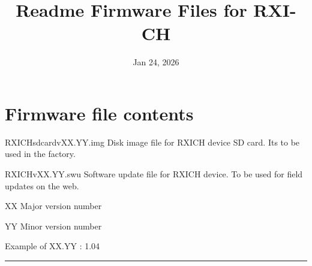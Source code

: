 \documentclass[letterpaper,10pt,english]{sphinxhowto}
\title{Readme Firmware Files for RXI-CH}
\date{Jan 24, 2026}
\author{}
\begin{document}
\pagestyle{empty}

\pagestyle{plain}

\pagestyle{normal}
\label{\detokenize{index::doc}}


\sphinxstepscope


\section{Firmware file contents}
\label{\detokenize{topics/readme_fwf:firmware-file-contents}}\label{\detokenize{topics/readme_fwf::doc}}
\sphinxAtStartPar
RXI\sphinxhyphen{}CH\sphinxhyphen{}sdcard\sphinxhyphen{}vXX.YY.img \sphinxhyphen{} Disk image file for RXI\sphinxhyphen{}CH device SD card. Its to be used in the factory.

\sphinxAtStartPar
RXI\sphinxhyphen{}CH\sphinxhyphen{}vXX.YY.swu \sphinxhyphen{} Software update file for RXI\sphinxhyphen{}CH device. To be used for field updates on the web.

\sphinxAtStartPar
XX \sphinxhyphen{} Major version number

\sphinxAtStartPar
YY \sphinxhyphen{} Minor version number

\sphinxAtStartPar
Example of XX.YY : 1.04


\bigskip\hrule\bigskip




\renewcommand{\indexname}{Index}
\printindex
\end{document}
